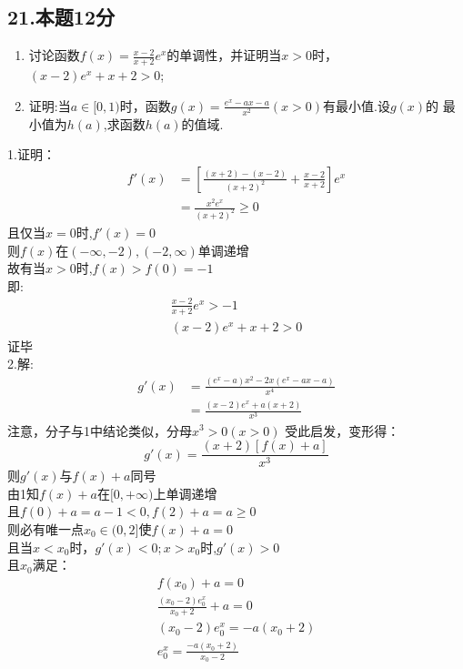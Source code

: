 \documentclass[UTF8]{ctexart}
\begin{document}
\subsection{21.本题12分}
\begin{enumerate}
    \item 讨论函数$f(x)=\frac{x-2}{x+2}e^x$的单调性，并证明当$x>0$时，$(x-2)e^x+x+2>0$;
    \item 证明:当$a\in [0,1)$时，函数$g(x)=\frac{e^x-ax-a}{x^2}(x>0)$有最小值.设$g(x)$的
          最小值为$h(a)$,求函数$h(a)$的值域.
\end{enumerate}
1.证明：\\
\[ \begin{aligned}
        f'(x) & =[\frac{(x+2)-(x-2)}{(x+2)^2}+\frac{x-2}{x+2}]e^x \\
              & =\frac{x^2e^x}{(x+2)^2}\geq 0
    \end{aligned}
\]
且仅当$x=0$时,$f'(x)=0$\\
则$f(x)$在$(-\infty,-2),(-2,\infty)$单调递增\\
故有当$x>0$时,$f(x)>f(0)=-1$\\
即:\[\begin{aligned}
        \frac{x-2}{x+2}e^x>-1 \\
        (x-2)e^x+x+2>0
    \end{aligned}    \]
证毕\\
2.解:\\
\[\begin{aligned}
    g'(x)&=\frac{(e^x-a)x^2-2x(e^x-ax-a)}{x^4}\\
    &=\frac{(x-2)e^x+a(x+2)}{x^3}
\end{aligned} \]
注意，分子与1中结论类似，分母$x^3>0(x>0)$
受此启发，变形得：
\[ g'(x)=\frac{(x+2)[f(x)+a]}{x^3} \]
则$g'(x)$与$f(x)+a$同号 \\
由1知$f(x)+a$在$[0,+\infty)$上单调递增 \\
且$f(0)+a=a-1<0,f(2)+a=a\geq 0$\\
则必有唯一点$x_0 \in (0,2]$使$f(x)+a=0$\\
且当$x<x_0$时，$g'(x)<0;x>x_0$时,$g'(x)>0$\\
且$x_0$满足：
\[\begin{aligned}
    f(x_0)+a=0 \\
    \frac{(x_0-2)e^x_0}{x_0+2}+a=0 \\
    (x_0-2)e^x_0=-a(x_0+2)\\
    e^x_0=\frac{-a(x_0+2)}{x_0-2}\\
\end{aligned}\]
\end{document}
